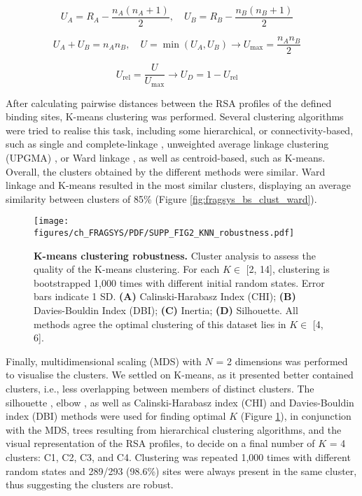 \begin{equation}
U_A = R_A - \frac{n_A(n_A + 1)}{2}, \quad U_B = R_B - \frac{n_B(n_B + 1)}{2} \quad
\label{eq:mann_whitney_U}
\end{equation}

\begin{equation}
U_A + U_B = n_A n_B, \quad U = \min(U_A, U_B) \rightarrow U_{\max} = \frac{n_A n_B}{2} \quad
\label{eq:maximum_U} 
\end{equation}

\begin{equation}
U_{\text{rel}} = \frac{U}{U_{\max}} \rightarrow U_D = 1 - U_{\text{rel}} \quad 
\label{eq:relative_U}
\end{equation}

After calculating pairwise distances between the RSA profiles of the defined binding sites, K-means clustering \cite{LLOYD_1982_KMEANS} was performed. Several clustering algorithms were tried to realise this task, including some hierarchical, or connectivity-based, such as single and complete-linkage \cite{SORENSEN_1948_CL}, unweighted average linkage clustering (UPGMA) \cite{SOKAL_1958_UPGMA}, or Ward linkage \cite{WARD_1963_CLUSTERING}, as well as centroid-based, such as K-means. Overall, the clusters obtained by the different methods were similar. Ward linkage and K-means resulted in the most similar clusters, displaying an average similarity between clusters of 85\% (Figure \ref{fig:fragsys_bs_clust_ward}).

\begin{figure}[htbp]
    \centering
    \texttt{[image: figures/ch\_FRAGSYS/PDF/SUPP\_FIG2\_KNN\_robustness.pdf]}
    \caption[K-means clustering robustness]{\textbf{K-means clustering robustness.} Cluster analysis to assess the quality of the K-means clustering. For each $K \in$ [2, 14], clustering is bootstrapped 1,000 times with different initial random states. Error bars indicate 1 SD. \textbf{(A)} Calinski-Harabasz Index (CHI); \textbf{(B)} Davies-Bouldin Index (DBI); \textbf{(C)} Inertia; \textbf{(D)} Silhouette. All methods agree the optimal clustering of this dataset lies in $K \in$ [4, 6].}
    \label{fig:kmeans_robustness}
\end{figure}

Finally, multidimensional scaling (MDS) \cite{MEAD_1992_MDS} with $N$ = 2 dimensions was performed to visualise the clusters. We settled on K-means, as it presented better contained clusters, i.e., less overlapping between members of distinct clusters. The silhouette \cite{ROUSSEEUW_1987_SILHOUETTES}, elbow \cite{THORNDIKE_1953_ELBOW}, as well as Calinski-Harabasz index (CHI) \cite{CALINSKI_1974_CHI} and Davies-Bouldin index (DBI) \cite{DAVIES_1979_DBI} methods were used for finding optimal $K$ (Figure \ref{fig:kmeans_robustness}), in conjunction with the MDS, trees resulting from hierarchical clustering algorithms, and the visual representation of the RSA profiles, to decide on a final number of $K$ = 4 clusters: C1, C2, C3, and C4. Clustering was repeated 1,000 times with different random states and 289/293 (98.6\%) sites were always present in the same cluster, thus suggesting the clusters are robust.


